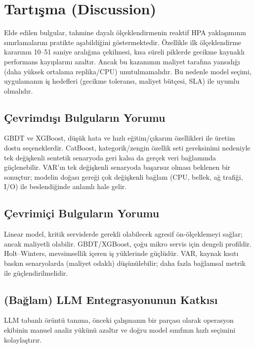\section{Tartışma (Discussion)}

Elde edilen bulgular, tahmine dayalı ölçeklendirmenin reaktif HPA yaklaşımının sınırlamalarını pratikte aşabildiğini göstermektedir. Özellikle ilk ölçeklendirme kararının 10–51 saniye aralığına çekilmesi, kısa süreli piklerde gecikme kaynaklı performans kayıplarını azaltır. Ancak bu kazanımın maliyet tarafına yansıdığı (daha yüksek ortalama replika/CPU) unutulmamalıdır. Bu nedenle model seçimi, uygulamanın iş hedefleri (gecikme toleransı, maliyet bütçesi, SLA) ile uyumlu olmalıdır.

\subsection{Çevrimdışı Bulguların Yorumu}

GBDT ve XGBoost, düşük hata ve hızlı eğitim/çıkarım özellikleri ile üretim dostu seçeneklerdir. CatBoost, kategorik/zengin özellik seti gereksinimi nedeniyle tek değişkenli sentetik senaryoda geri kalsa da gerçek veri bağlamında güçlenebilir. VAR'ın tek değişkenli senaryoda başarısız olması beklenen bir sonuçtur; modelin doğası gereği çok değişkenli bağlam (CPU, bellek, ağ trafiği, I/O) ile beslendiğinde anlamlı hale gelir.

\subsection{Çevrimiçi Bulguların Yorumu}

Linear model, kritik servislerde gerekli olabilecek agresif ön-ölçeklemeyi sağlar; ancak maliyetli olabilir. GBDT/XGBoost, çoğu mikro servis için dengeli profildir. Holt–Winters, mevsimsellik içeren iş yüklerinde güçlüdür. VAR, kaynak kısıtı baskın senaryolarda (maliyet odaklı) düşünülebilir; daha fazla bağlamsal metrik ile güçlendirilmelidir.

\subsection{(Bağlam) LLM Entegrasyonunun Katkısı}

LLM tabanlı örüntü tanıma, önceki çalışmanın bir parçası olarak operasyon ekibinin manuel analiz yükünü azaltır ve doğru model sınıfının hızlı seçimini kolaylaştırır. %

